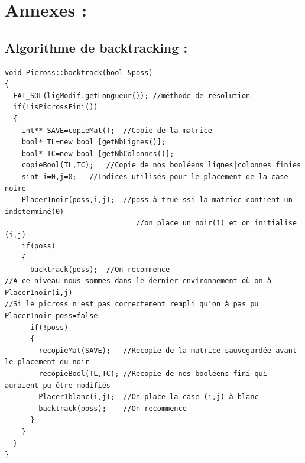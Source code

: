 \documentclass{article}
\begin{document}
\section{Annexes :}
\subsection{Algorithme de backtracking :}
\begin{verbatim}
void Picross::backtrack(bool &poss)
{
  FAT_SOL(ligModif.getLongueur()); //méthode de résolution
  if(!isPicrossFini())
  {
    int** SAVE=copieMat();	//Copie de la matrice
    bool* TL=new bool [getNbLignes()];
    bool* TC=new bool [getNbColonnes()];
    copieBool(TL,TC);	//Copie de nos booléens lignes|colonnes finies
    sint i=0,j=0;	//Indices utilisés pour le placement de la case noire
    Placer1noir(poss,i,j);	//poss à true ssi la matrice contient un indeterminé(0) 
                               //on place un noir(1) et on initialise (i,j)
    if(poss)
    {
      backtrack(poss);	//On recommence
//A ce niveau nous sommes dans le dernier environnement où on à Placer1noir(i,j)
//Si le picross n'est pas correctement rempli qu'on à pas pu Placer1noir poss=false
      if(!poss)
      {
        recopieMat(SAVE);	//Recopie de la matrice sauvegardée avant le placement du noir
        recopieBool(TL,TC);	//Recopie de nos booléens fini qui auraient pu être modifiés
        Placer1blanc(i,j);	//On place la case (i,j) à blanc
        backtrack(poss);	//On recommence
      }
    }
  }
}
\end{verbatim}
\end{document}
